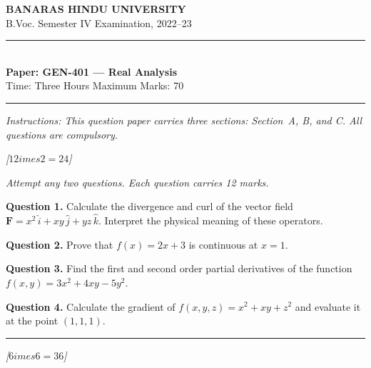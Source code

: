 \documentclass[11pt,a4paper]{article}
\newcommand{\pts}[1]{\hfill   \textit{[#1]}}
\begin{document}
\begin{center}
  {\large\bfseries BANARAS HINDU UNIVERSITY}\\[2pt]
  {
\normalsize B.Voc. Semester IV Examination, 2022--23}\\[6pt]
  \rule{0.8\linewidth}{0.5pt}\\[6pt]
  {\large\bfseries Paper: GEN-401 --- Real Analysis}\\[4pt]
  {
\normalsize Time: Three Hours \hfill Maximum Marks: 70}
\end{center}

\rule{\linewidth}{0.4pt}

\smallskip



\noindent   \textit{Instructions: This question paper carries three sections: Section~A, B, and C. All questions are compulsory.}

\bigskip




\pts{$12 imes2=24$}

\medskip


\noindent   \textit{Attempt any two questions. Each question carries 12 marks.}

\bigskip




\noindent   \textbf{Question 1.} Calculate the divergence and curl of the vector field $\mathbf{F} = x^2\,\hat{i} + xy\,\hat{j} + yz\,\hat{k}$. Interpret the physical meaning of these operators.

\bigskip




\noindent   \textbf{Question 2.} Prove that $f(x) = 2x + 3$ is continuous at $x = 1$.

\bigskip




\noindent   \textbf{Question 3.} Find the first and second order partial derivatives of the function $f(x,y) = 3x^2 + 4xy - 5y^2$.

\bigskip




\noindent   \textbf{Question 4.} Calculate the gradient of $f(x,y,z) = x^2 + xy + z^2$ and evaluate it at the point $(1,1,1)$.

\bigskip

\rule{\linewidth}{0.4pt}



\pts{$6 imes6=36$}
\end{document}
